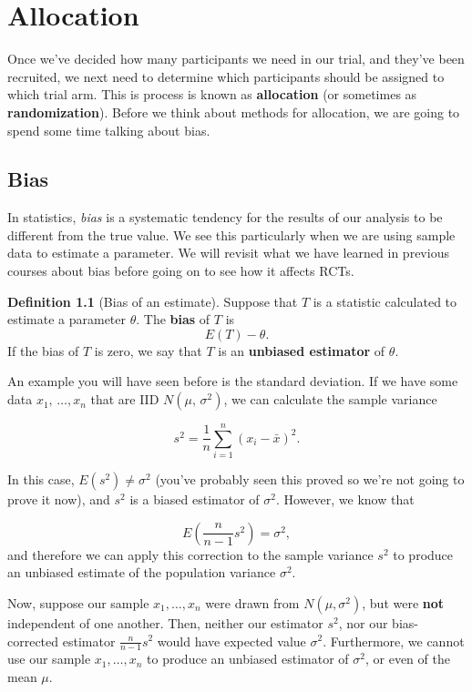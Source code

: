 \documentclass[
  openany]{book}
\theoremstyle{definition}
\newtheorem{definition}{Definition}[chapter]
\theoremstyle{definition}
\theoremstyle{definition}
\theoremstyle{definition}
\theoremstyle{remark}
\begin{document}
\hypertarget{alloc}{%
\chapter{Allocation}\label{alloc}}

Once we've decided how many participants we need in our trial, and they've been recruited, we next need to determine which participants should be assigned to which trial arm. This is process is known as \textbf{allocation} (or sometimes as \textbf{randomization}). Before we think about methods for allocation, we are going to spend some time talking about bias.

\hypertarget{bias}{%
\section{Bias}\label{bias}}

In statistics, \emph{bias} is a systematic tendency for the results of our analysis to be different from the true value. We see this particularly when we are using sample data to estimate a parameter. We will revisit what we have learned in previous courses about bias before going on to see how it affects RCTs.

\begin{definition}[Bias of an estimate]
Suppose that \(T\) is a statistic calculated to estimate a parameter \(\theta\). The \textbf{bias} of \(T\) is \[E\left(T\right) - \theta.\] If the bias of \(T\) is zero, we say that \(T\) is an \textbf{unbiased estimator} of \(\theta\).
\end{definition}

An example you will have seen before is the standard deviation. If we have some data \(x_1,\,\ldots,x_n\) that are IID \(N\left(\mu,\,\sigma^2\right)\), we can calculate the sample variance

\[ s^2 = \frac{1}{n}\sum\limits_{i=1}^n\left(x_i - \bar{x}\right)^2 .\]

In this case, \(E\left(s^2\right) \neq {\sigma^2}\) (you've probably seen this proved so we're not going to prove it now), and \(s^2\) is a biased estimator of \(\sigma^2\). However, we know that

\[E \left(\frac{n}{n-1}s^2\right) = \sigma^2,\]
and therefore we can apply this correction to the sample variance \(s^2\) to produce an unbiased estimate of the population variance \(\sigma^2\).

Now, suppose our sample \(x_1,\ldots,x_n\) were drawn from \(N\left(\mu,\sigma^2\right)\), but were \textbf{not} independent of one another. Then, neither our estimator \(s^2\), nor our bias-corrected estimator \(\frac{n}{n-1}s^2\) would have expected value \(\sigma^2\). Furthermore, we cannot use our sample \(x_1,\ldots,x_n\) to produce an unbiased estimator of \(\sigma^2\), or even of the mean \(\mu\).
\end{document}
